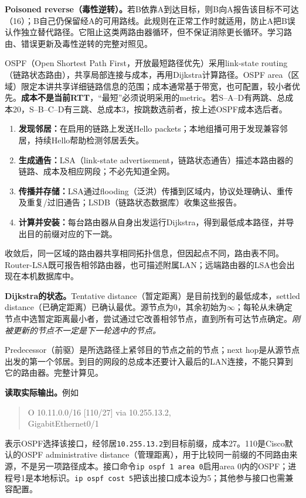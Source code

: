 \textbf{Poisoned reverse（毒性逆转）。}若B依靠A到达目标，则B向A报告该目标不可达（16）；B自己仍保留经A的可用路线。此规则在正常工作时就适用，防止A把B误认作独立替代路径。它阻止这类两路由器循环，但不保证消除更长循环。学习路由、错误更新及毒性逆转的完整对照见。


OSPF（Open Shortest Path First，开放最短路径优先）采用link-state routing（链路状态路由），共享局部连接与成本，再用Dijkstra计算路径。OSPF area（区域）限定本讲共享详细链路信息的范围；成本通常基于带宽，也可配置，较小者优先。\textbf{成本不是当前RTT}，“最短”必须说明采用的metric。若S--A--D有两跳、总成本20，S--B--C--D有三跳、总成本3，按跳数选前者，按上述OSPF成本选后者。

\begin{enumerate}[label=\arabic*.]
 \item \textbf{发现邻居：}在启用的链路上发送Hello packets；本地组播可用于发现兼容邻居，持续Hello帮助检测邻居丢失。
 \item \textbf{生成通告：}LSA（link-state advertisement，链路状态通告）描述本路由器的链路、成本及相应网段；不必先知道全网。
 \item \textbf{传播并存储：}LSA通过flooding（泛洪）传播到区域内，协议处理确认、重传及重复/过旧通告；LSDB（链路状态数据库）收集这些报告。
 \item \textbf{计算并安装：}每台路由器从自身出发运行Dijkstra，得到最低成本路径，并导出目的前缀对应的下一跳。
\end{enumerate}

收敛后，同一区域的路由器共享相同拓扑信息，但因起点不同，路由表不同。Router-LSA既可报告相邻路由器，也可描述附属LAN；远端路由器的LSA也会出现在本机数据库中。

\textbf{Dijkstra的状态。}Tentative distance（暂定距离）是目前找到的最低成本，settled distance（已确定距离）已确认最优。源节点为0，其余初始为$\infty$；每轮从未确定节点中选暂定距离最小者，尝试通过它改善相邻节点，直到所有可达节点确定。\emph{刚被更新的节点不一定是下一轮选中的节点。}

Predecessor（前驱）是所选路径上紧邻目的节点之前的节点；next hop是从源节点出发的第一个邻居。到目的网段的总成本还要计入最后的LAN连接，不能只算到它的路由器。完整计算见。

\textbf{读取实际输出。}例如
\begin{quote}\small\ttfamily
O 10.11.0.0/16 [110/27] via 10.255.13.2,\\
\hspace*{1em}GigabitEthernet0/1
\end{quote}
表示OSPF选择该接口，经邻居\texttt{10.255.13.2}到目标前缀，成本27。110是Cisco默认的OSPF administrative distance（管理距离），用于比较同一前缀的不同路由来源，不是另一项路径成本。接口命令\texttt{ip ospf 1 area 0}启用area 0内的OSPF；进程号1是本地标识。\texttt{ip ospf cost 5}把该出接口成本设为5；其他参与接口也需兼容配置。

